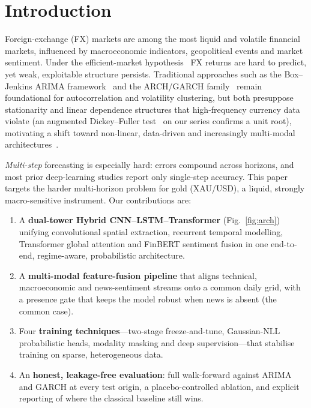 \documentclass[conference]{IEEEtran}
\begin{document}
\section{Introduction}
Foreign-exchange (FX) markets are among the most liquid and volatile financial markets,
influenced by macroeconomic indicators, geopolitical events and market sentiment. Under the
efficient-market hypothesis~\cite{fama} FX returns are hard to predict, yet weak,
exploitable structure persists. Traditional approaches such as the Box--Jenkins ARIMA
framework~\cite{box} and the ARCH/GARCH family~\cite{arch,garch} remain foundational for
autocorrelation and volatility clustering, but both presuppose stationarity and linear
dependence structures that high-frequency currency data violate (an augmented
Dickey--Fuller test~\cite{adf} on our series confirms a unit root), motivating a shift
toward non-linear, data-driven and increasingly multi-modal architectures~\cite{limzohren,
sezer}.

\emph{Multi-step} forecasting is especially hard: errors compound across horizons, and most
prior deep-learning studies report only single-step accuracy. This paper targets the harder
multi-horizon problem for gold (XAU/USD), a liquid, strongly macro-sensitive instrument.
Our contributions are:
\begin{enumerate}
\item A \textbf{dual-tower Hybrid CNN--LSTM--Transformer} (Fig.~\ref{fig:arch}) unifying
convolutional spatial extraction, recurrent temporal modelling, Transformer global
attention and FinBERT sentiment fusion in one end-to-end, regime-aware, probabilistic
architecture.
\item A \textbf{multi-modal feature-fusion pipeline} that aligns technical, macroeconomic
and news-sentiment streams onto a common daily grid, with a presence gate that keeps the
model robust when news is absent (the common case).
\item Four \textbf{training techniques}---two-stage freeze-and-tune, Gaussian-NLL
probabilistic heads, modality masking and deep supervision---that stabilise training on
sparse, heterogeneous data.
\item An \textbf{honest, leakage-free evaluation}: full walk-forward against ARIMA and GARCH
at every test origin, a placebo-controlled ablation, and explicit reporting of where the
classical baseline still wins.
\end{enumerate}
\end{document}

